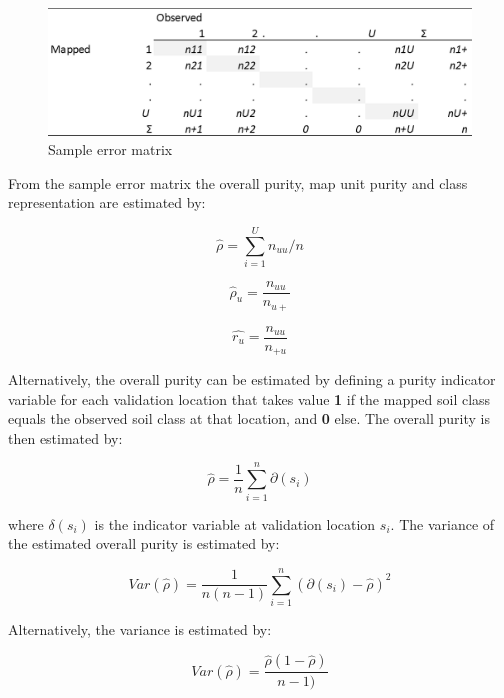 \documentclass[10pt,b5paper,]{book}
\theoremstyle{definition}
\theoremstyle{definition}
\theoremstyle{definition}
\theoremstyle{remark}
\begin{document}
\begin{figure}

{\centering \includegraphics[width=0.8\linewidth]{images/Validation_error_matrix} 

}

\caption{Sample error matrix}\label{fig:errormatrix}
\end{figure}

From the sample error matrix the overall purity, map unit purity and
class representation are estimated by:

\begin{equation}
\hat{\rho} = \sum_{i=1}^{U} n_{uu} / n
\end{equation}

\begin{equation}
\hat{\rho}_u = \frac{ n_{uu}}{n_{u+}}
\end{equation}

\begin{equation}
\hat{r_u} = \frac{ n_{uu}}{n_{+u}}
\end{equation}

Alternatively, the overall purity can be estimated by defining a purity
indicator variable for each validation location that takes value
\textbf{1} if the mapped soil class equals the observed soil class at
that location, and \textbf{0} else. The overall purity is then estimated
by:

\begin{equation}
\hat{\rho} = \frac{1}{n} \sum_{i=1}^{n} \partial(s_i)
\end{equation}

where \({\delta(s_i)}\) is the indicator variable at validation location
\(s_i\). The variance of the estimated overall purity is estimated by:

\begin{equation}
Var(\hat{\rho}) = \frac{1}{n(n-1)} \sum_{i=1}^{n} (\partial(s_i) - \hat{\rho})^2
\end{equation}

Alternatively, the variance is estimated by:

\begin{equation}
Var(\hat{\rho}) = \frac{\hat{\rho}(1 - \hat{\rho})}{n - 1)}
\end{equation}
\end{document}
